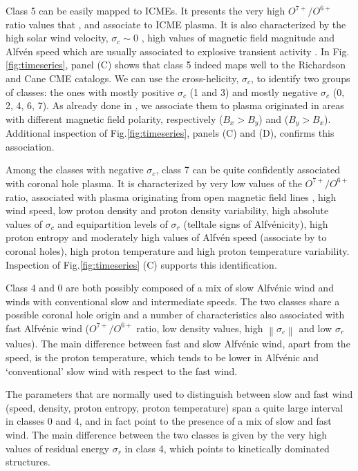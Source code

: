 \documentclass[utf8]{frontiersSCNS} %
\begin{document}
Class 5 can be easily mapped to ICMEs. It presents the very high $O^{7+}/O^{6+}$ ratio values that \citep{Zhao2009}, \citep{Stakhiv2015} and \citep{Xu2015b} associate to ICME plasma. It is also characterized by the high solar wind velocity, $\sigma_c \sim 0$ \citep{Roberts2020}, high values of magnetic field magnitude and Alfv\'en speed which are usually associated to explosive transient activity \citep{Xu2015b}. In Fig.\ref{fig:timeseries}, panel (C) shows that class 5 indeed maps well to the Richardson and Cane CME catalogs. We can use the cross-helicity, $\sigma_c$, to identify two groups of classes: the ones with mostly positive $\sigma_c$ (1 and 3) and mostly negative $\sigma_c$ (0, 2, 4, 6, 7). As already done in \citep{Roberts2020}, we associate them to plasma originated in areas with different magnetic field polarity, respectively ($B_x> B_y$) and ($B_y> B_x$). Additional inspection of Fig.\ref{fig:timeseries}, panels (C) and (D), confirms this association.

Among the classes with negative $\sigma_c$, class 7 can be quite confidently associated with coronal hole plasma. It is characterized by very low values of the $O^{7+}/O^{6+}$ ratio, associated with plasma originating from open magnetic field lines \citep{Zhao2009,Stakhiv2015}, high wind speed, low proton density and proton density variability, high absolute values of $\sigma_c$ and equipartition levels of $\sigma_r$ (telltale signs of Alfv\'enicity), high proton entropy and moderately high values of Alfv\'en speed (associate by \citep{Xu2015b} to coronal holes), high proton temperature and high proton temperature variability. Inspection of Fig.\ref{fig:timeseries} (C) supports this identification.

Class 4 and 0 are both possibly composed of a mix of slow Alfv\'enic wind \citep{DAmicis2015} and winds with conventional slow and intermediate speeds. The two classes share a possible coronal hole origin and a number of characteristics also associated with fast Alfv\'enic wind ($O^{7+}/O^{6+}$ ratio, low density values, high $\left\lVert \sigma_c \right\rVert$ and low $\sigma_r$ values). The main difference between fast and slow Alfv\'enic wind, apart from the speed, is the proton temperature, which tends to be lower in Alfv\'enic and `conventional' slow wind with respect to the fast wind.
 
The parameters that are normally used to distinguish between slow and fast wind (speed, density, proton entropy, proton temperature) span a quite large interval in classes 0 and 4, and in fact point to the presence of a mix of slow and fast wind. The main difference between the two classes is given by the very high values of residual energy $\sigma_r$ in class 4, which points to kinetically dominated structures.
\end{document}
